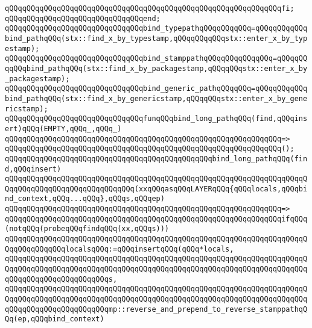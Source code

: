 \verb|qQQqqQQqqQQqqQQqqQQqqQQqqQQqqQQqqQQqqQQqqQQqqQQqqQQqqQQqqQQqqQQqfi;|\newline
\verb|qQQqqQQqqQQqqQQqqQQqqQQqqQQqqQQqend;|\newline
\newline
\verb|qQQqqQQqqQQqqQQqqQQqqQQqqQQqqQQqbind_typepathqQQqqQQqqQQq=qQQqqQQqqQQqbind_pathqQQq(stx::find_x_by_typestamp,qQQqqQQqqQQqstx::enter_x_by_typestamp);|\newline
\verb|qQQqqQQqqQQqqQQqqQQqqQQqqQQqqQQqbind_stamppathqQQqqQQqqQQqqQQq=qQQqqQQqqQQqbind_pathqQQq(stx::find_x_by_packagestamp,qQQqqQQqstx::enter_x_by_packagestamp);|\newline
\verb|qQQqqQQqqQQqqQQqqQQqqQQqqQQqqQQqbind_generic_pathqQQqqQQq=qQQqqQQqqQQqbind_pathqQQq(stx::find_x_by_genericstamp,qQQqqQQqstx::enter_x_by_genericstamp);|\newline
\newline
\verb|qQQqqQQqqQQqqQQqqQQqqQQqqQQqqQQqfunqQQqbind_long_pathqQQq(find,qQQqinsert)qQQq(EMPTY,qQQq_,qQQq_)|\newline
\verb|qQQqqQQqqQQqqQQqqQQqqQQqqQQqqQQqqQQqqQQqqQQqqQQqqQQqqQQqqQQqqQQq=>|\newline
\verb|qQQqqQQqqQQqqQQqqQQqqQQqqQQqqQQqqQQqqQQqqQQqqQQqqQQqqQQqqQQqqQQq();|\newline
\newline
\verb|qQQqqQQqqQQqqQQqqQQqqQQqqQQqqQQqqQQqqQQqqQQqqQQqbind_long_pathqQQq(find,qQQqinsert)|\newline
\verb|qQQqqQQqqQQqqQQqqQQqqQQqqQQqqQQqqQQqqQQqqQQqqQQqqQQqqQQqqQQqqQQqqQQqqQQqqQQqqQQqqQQqqQQqqQQqqQQqqQQq(xxqQQqasqQQqLAYERqQQq{qQQqlocals,qQQqbind_context,qQQq...qQQq},qQQqs,qQQqep)|\newline
\verb|qQQqqQQqqQQqqQQqqQQqqQQqqQQqqQQqqQQqqQQqqQQqqQQqqQQqqQQqqQQqqQQq=>|\newline
\verb|qQQqqQQqqQQqqQQqqQQqqQQqqQQqqQQqqQQqqQQqqQQqqQQqqQQqqQQqqQQqqQQqifqQQq(notqQQq(probeqQQqfindqQQq(xx,qQQqs)))|\newline
\newline
\verb|qQQqqQQqqQQqqQQqqQQqqQQqqQQqqQQqqQQqqQQqqQQqqQQqqQQqqQQqqQQqqQQqqQQqqQQqqQQqqQQqqQQqlocalsqQQq:=qQQqinsertqQQq(qQQq*locals,|\newline
\verb|qQQqqQQqqQQqqQQqqQQqqQQqqQQqqQQqqQQqqQQqqQQqqQQqqQQqqQQqqQQqqQQqqQQqqQQqqQQqqQQqqQQqqQQqqQQqqQQqqQQqqQQqqQQqqQQqqQQqqQQqqQQqqQQqqQQqqQQqqQQqqQQqqQQqqQQqqQQqqQQqqQQqs,|\newline
\verb|qQQqqQQqqQQqqQQqqQQqqQQqqQQqqQQqqQQqqQQqqQQqqQQqqQQqqQQqqQQqqQQqqQQqqQQqqQQqqQQqqQQqqQQqqQQqqQQqqQQqqQQqqQQqqQQqqQQqqQQqqQQqqQQqqQQqqQQqqQQqqQQqqQQqqQQqqQQqqQQqqQQqmp::reverse_and_prepend_to_reverse_stamppathqQQq(ep,qQQqbind_context)|\newline
